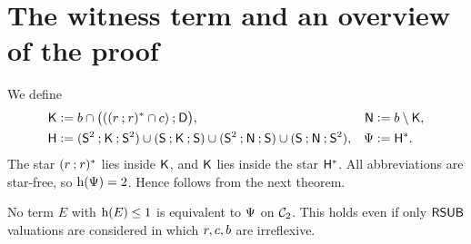 \section{The witness term and an overview of the proof}\label{section: overview}

We define
\begin{equation}\label{equation: Psi}
  \begin{aligned}
    \mathsf{K}    &\mathrel{\vcentcolon=} b \cap \bigl(((r \mathbin{;} r)^{*} \cap c) \mathbin{;} \mathsf{D}\bigr), &
    \mathsf{N}    &\mathrel{\vcentcolon=} b \setminus \mathsf{K},\\
    \mathsf{H}    &\mathrel{\vcentcolon=} (\mathsf{S}^{2} \mathbin{;} \mathsf{K} \mathbin{;} \mathsf{S}^{2}) \cup (\mathsf{S} \mathbin{;} \mathsf{K} \mathbin{;} \mathsf{S})
              \cup (\mathsf{S}^{2} \mathbin{;} \mathsf{N} \mathbin{;} \mathsf{S}) \cup (\mathsf{S} \mathbin{;} \mathsf{N} \mathbin{;} \mathsf{S}^{2}), &
    \Psi  &\mathrel{\vcentcolon=} \mathsf{H}^{*}.
  \end{aligned}
\end{equation}
The star $(r \mathbin{;} r)^{*}$ lies inside $\mathsf{K}$, and $\mathsf{K}$ lies inside the star $\mathsf{H}^{*}$.
All abbreviations are star-free, so $\mathrm{h}(\Psi) = 2$.
Hence  follows from the next theorem.

\begin{theorem}\label{theorem: lower bound}
  No term $E$ with $\mathrm{h}(E) \le 1$ is equivalent to $\Psi$ on $\mathcal{C}_{2}$.
  This holds even if only $\mathsf{RSUB}$ valuations are considered in which $r, c, b$ are irreflexive.
\end{theorem}


